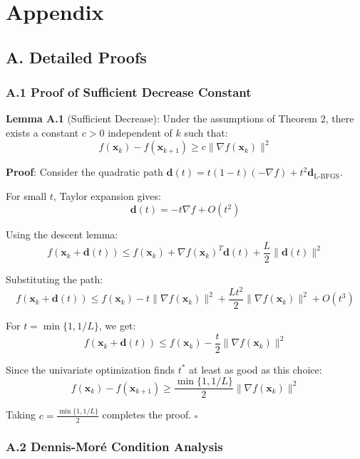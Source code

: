 \hypertarget{appendix}{%
\section{Appendix}\label{appendix}}

\hypertarget{a.-detailed-proofs}{%
\subsection{A. Detailed Proofs}\label{a.-detailed-proofs}}

\hypertarget{a.1-proof-of-sufficient-decrease-constant}{%
\subsubsection{A.1 Proof of Sufficient Decrease Constant}\label{a.1-proof-of-sufficient-decrease-constant}}

\textbf{Lemma A.1} (Sufficient Decrease): Under the assumptions of Theorem 2, there exists a constant \(c > 0\) independent of \(k\) such that:
\[f(\mathbf{x}_k) - f(\mathbf{x}_{k+1}) \geq c\|\nabla f(\mathbf{x}_k)\|^2\]

\textbf{Proof}: Consider the quadratic path \(\mathbf{d}(t) = t(1-t)(-\nabla f) + t^2 \mathbf{d}_{\text{L-BFGS}}\).

For small \(t\), Taylor expansion gives:
\[\mathbf{d}(t) = -t\nabla f + O(t^2)\]

Using the descent lemma:
\[f(\mathbf{x}_k + \mathbf{d}(t)) \leq f(\mathbf{x}_k) + \nabla f(\mathbf{x}_k)^T \mathbf{d}(t) + \frac{L}{2}\|\mathbf{d}(t)\|^2\]

Substituting the path:
\[f(\mathbf{x}_k + \mathbf{d}(t)) \leq f(\mathbf{x}_k) - t\|\nabla f(\mathbf{x}_k)\|^2 + \frac{Lt^2}{2}\|\nabla f(\mathbf{x}_k)\|^2 + O(t^3)\]

For \(t = \min\{1, 1/L\}\), we get:
\[f(\mathbf{x}_k + \mathbf{d}(t)) \leq f(\mathbf{x}_k) - \frac{t}{2}\|\nabla f(\mathbf{x}_k)\|^2\]

Since the univariate optimization finds \(t^*\) at least as good as this choice:
\[f(\mathbf{x}_k) - f(\mathbf{x}_{k+1}) \geq \frac{\min\{1, 1/L\}}{2}\|\nabla f(\mathbf{x}_k)\|^2\]

Taking \(c = \frac{\min\{1, 1/L\}}{2}\) completes the proof. \(\square\)

\hypertarget{a.2-dennis-moruxe9-condition-analysis}{%
\subsubsection{A.2 Dennis-Moré Condition Analysis}\label{a.2-dennis-moruxe9-condition-analysis}}

